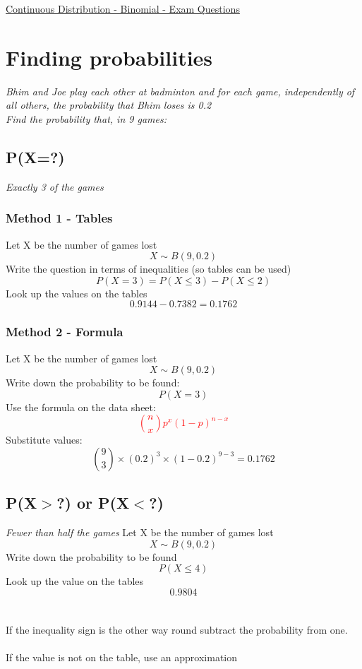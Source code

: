 \documentclass{article}[18pt]
\begin{document}
\begin{center}
\underline{\huge Continuous Distribution - Binomial - Exam Questions}
\end{center}
\section{Finding probabilities}
\textit{Bhim and Joe play each other at badminton and for each game, independently of all others, the
probability that Bhim loses is 0.2\\
Find the probability that, in 9 games:}
\subsection{P(X=?)}
\textit{Exactly 3 of the games}
\subsubsection{Method 1 - Tables}
Let X be the number of games lost
$$X\sim B(9,0.2)$$
Write the question in terms of inequalities (so tables can be used)
$$P(X=3)=P(X\leqslant3)-P(X\leqslant2)$$
Look up the values on the tables
$$0.9144-0.7382=0.1762$$
\subsubsection{Method 2 - Formula}
Let X be the number of games lost
$$X\sim B(9,0.2)$$
Write down the probability to be found:
$$P(X=3)$$
Use the formula on the data sheet:
\textcolor{red}{$$\binom{n}{x}p^x(1-p)^{n-x}$$}
Substitute values:
$$\binom{9}{3}\times(0.2)^3\times(1-0.2)^{9-3}=0.1762$$
\subsection{P(X$>$?) or P(X$<$?)}
\textit{Fewer than half the games}
Let X be the number of games lost
$$X\sim B(9,0.2)$$
Write down the probability to be found
$$P(X\leqslant4)$$
Look up the value on the tables
$$0.9804$$
\\
\\
If the inequality sign is the other way round subtract the probability from one.\\
\\
If the value is not on the table, use an approximation
\end{document}

